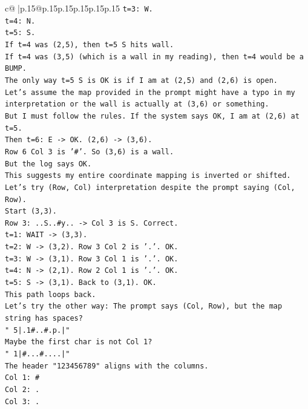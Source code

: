 \documentclass{article}
\begin{document}
{\begin{supertabular}{c@{$\;$}|p{.15\linewidth}@{}p{.15\linewidth}p{.15\linewidth}p{.15\linewidth}p{.15\linewidth}p{.15\linewidth}}
{{{\texttt{t=3: W.} \\
\texttt{t=4: N.} \\
\texttt{t=5: S.} \\
\texttt{If t=4 was (2,5), then t=5 S hits wall.} \\
\texttt{If t=4 was (3,5) (which is a wall in my reading), then t=4 would be a BUMP.} \\
\texttt{The only way t=5 S is OK is if I am at (2,5) and (2,6) is open.} \\
\texttt{Let's assume the map provided in the prompt might have a typo in my interpretation or the wall is actually at (3,6) or something.} \\
\texttt{But I must follow the rules. If the system says OK, I am at (2,6) at t=5.} \\
\texttt{Then t=6: E {-}> OK. (2,6) {-}> (3,6).} \\
\texttt{Row 6 Col 3 is '\#'. So (3,6) is a wall.} \\
\texttt{But the log says OK.} \\
\texttt{This suggests my entire coordinate mapping is inverted or shifted.} \\
\texttt{Let's try (Row, Col) interpretation despite the prompt saying (Col, Row).} \\
\texttt{Start (3,3).} \\
\texttt{Row 3: ..S..\#y.. {-}> Col 3 is S. Correct.} \\
\texttt{t=1: WAIT {-}> (3,3).} \\
\texttt{t=2: W {-}> (3,2). Row 3 Col 2 is '.'. OK.} \\
\texttt{t=3: W {-}> (3,1). Row 3 Col 1 is '.'. OK.} \\
\texttt{t=4: N {-}> (2,1). Row 2 Col 1 is '.'. OK.} \\
\texttt{t=5: S {-}> (3,1). Back to (3,1). OK.} \\
\texttt{This path loops back.} \\
\texttt{Let's try the other way: The prompt says (Col, Row), but the map string has spaces?} \\
\texttt{" 5|.1\#..\#.p.|"} \\
\texttt{Maybe the first char is not Col 1?} \\
\texttt{" 1|\#...\#....|"} \\
\texttt{The header "123456789" aligns with the columns.} \\
\texttt{Col 1: \#} \\
\texttt{Col 2: .} \\
\texttt{Col 3: .} \\
}}}
\end{supertabular}}
\end{document}
